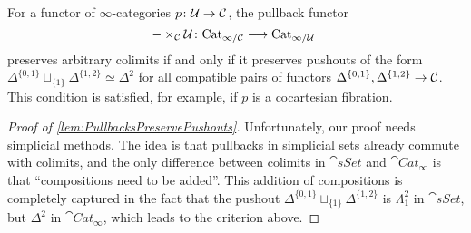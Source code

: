 \begin{lem}\label{lem:PullbacksPreservePushouts}
	For a functor of $\infty$-categories $p\colon \mathcal{U}\rightarrow \mathcal{C}$, the pullback functor
	\begin{equation*}
		-\times_{\mathcal{C}} \mathcal{U}\colon \mathrm{Cat}_{\infty/\mathcal{C}}\longrightarrow \mathrm{Cat}_{\infty/\mathcal{U}}\
	\end{equation*}
	preserves arbitrary colimits if and only if it preserves pushouts  of the form $\Delta^{\{0,1\}}\sqcup_{\{1\}}\Delta^{\{1,2\}}\simeq \Delta^2$ for all compatible pairs of functors $\Delta^{\{0,1\}},\Delta^{\{1,2\}}\rightarrow \mathcal{C}$. This condition is satisfied, for example, if $p$ is a cocartesian fibration.
\end{lem}
\begin{proof}[Proof of \cref{lem:PullbacksPreservePushouts}]
	Unfortunately, our proof needs simplicial methods. The idea is that pullbacks in simplicial sets already commute with colimits, and the only difference between colimits in $\cat{sSet}$ and $\cat{Cat}_\infty$ is that \enquote{compositions need to be added}. This addition of compositions is completely captured in the fact that the pushout $\Delta^{\{0,1\}}\sqcup_{\{1\}}\Delta^{\{1,2\}}$ is $\Lambda_1^2$ in $\cat{sSet}$, but $\Delta^2$ in $\cat{Cat}_\infty$, which leads to the criterion above.
	

\end{proof}
